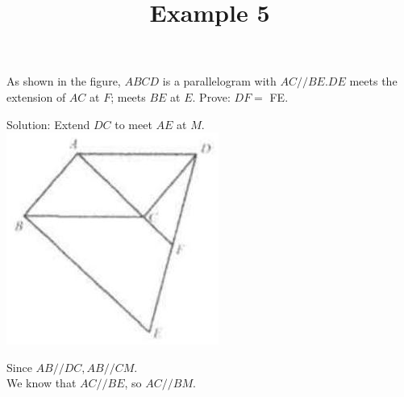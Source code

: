 \documentclass{article}
\title{Example 5}
\date{}
\begin{document}
\maketitle

As shown in the figure, \(A B C D\) is a parallelogram with \(A C / / B E . D E\) meets the extension of \(A C\) at \(F\); meets \(B E\) at \(E\). Prove: \(D F=\) FE.

Solution:
Extend \(D C\) to meet \(A E\) at \(M\).\\
\centering
\includegraphics[width=\textwidth]{images/problem_image_1.jpg}

Since \(A B / / D C, A B / / C M\).\\
We know that \(A C / / B E\), so \(A C / / B M\).
\end{document}
